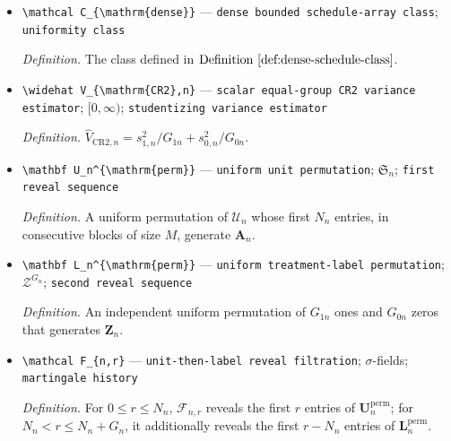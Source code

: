 \documentclass{article}
\begin{document}
\begin{itemize}
  \par\smallskip\noindent\emph{Definition.} \(s_{z,n}^2=(G_{zn}-1)^{-1}\sum_{g:Z_{ng}=z}(H^{\mathrm{obs}}_{ng}-\bar H_{z,n})^2\), where \(G_{zn}=G_{1n}\) for \(z=1\), \(G_{zn}=G_{0n}\) for \(z=0\), and \(\bar H_{z,n}=G_{zn}^{-1}\sum_{g:Z_{ng}=z}H^{\mathrm{obs}}_{ng}\).
  \item \texttt{\textbackslash{}\allowbreak{}mathcal C\_\allowbreak{}\{\textbackslash{}\allowbreak{}mathrm\{dense\}\allowbreak{}\}\allowbreak{}} --- \texttt{dense bounded schedule-\allowbreak{}array class}; \texttt{uniformity class}
  \par\smallskip\noindent\emph{Definition.} The class defined in \(\mathrm{Definition}~\ref{def:dense-schedule-class}\).
  \item \texttt{\textbackslash{}\allowbreak{}widehat V\_\allowbreak{}\{\textbackslash{}\allowbreak{}mathrm\{CR2\}\allowbreak{},\allowbreak{}n\}\allowbreak{}} --- \texttt{scalar equal-\allowbreak{}group CR2 variance estimator}; \([0,\infty)\); \texttt{studentizing variance estimator}
  \par\smallskip\noindent\emph{Definition.} \(\widehat V_{\mathrm{CR2},n}=s_{1,n}^2/G_{1n}+s_{0,n}^2/G_{0n}\).
  \item \texttt{\textbackslash{}\allowbreak{}mathbf U\_\allowbreak{}n\textasciicircum{}\{\textbackslash{}\allowbreak{}mathrm\{perm\}\allowbreak{}\}\allowbreak{}} --- \texttt{uniform unit permutation}; \(\mathfrak S_n\); \texttt{first reveal sequence}
  \par\smallskip\noindent\emph{Definition.} A uniform permutation of \(\mathcal U_n\) whose first \(N_n\) entries, in consecutive blocks of size \(M\), generate \(\mathbf A_n\).
  \item \texttt{\textbackslash{}\allowbreak{}mathbf L\_\allowbreak{}n\textasciicircum{}\{\textbackslash{}\allowbreak{}mathrm\{perm\}\allowbreak{}\}\allowbreak{}} --- \texttt{uniform treatment-\allowbreak{}label permutation}; \(\mathcal Z^{G_n}\); \texttt{second reveal sequence}
  \par\smallskip\noindent\emph{Definition.} An independent uniform permutation of \(G_{1n}\) ones and \(G_{0n}\) zeros that generates \(\mathbf Z_n\).
  \item \texttt{\textbackslash{}\allowbreak{}mathcal F\_\allowbreak{}\{n,\allowbreak{}r\}\allowbreak{}} --- \texttt{unit-\allowbreak{}then-\allowbreak{}label reveal filtration}; \(\sigma\)-fields; \texttt{martingale history}
  \par\smallskip\noindent\emph{Definition.} For \(0\le r\le N_n\), \(\mathcal F_{n,r}\) reveals the first \(r\) entries of \(\mathbf U_n^{\mathrm{perm}}\); for \(N_n<r\le N_n+G_n\), it additionally reveals the first \(r-N_n\) entries of \(\mathbf L_n^{\mathrm{perm}}\).

\end{itemize}
\end{document}
